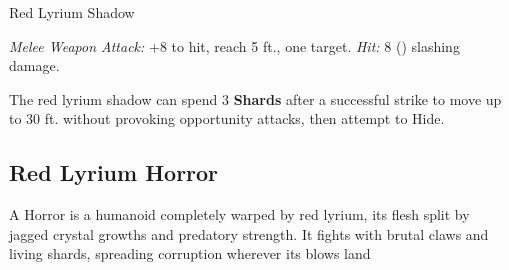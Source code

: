 \documentclass[letterpaper,twocolumn,openany,nodeprecatedcode,breakable,skins,xparse,most]{dndbook}
\begin{document}
\begin{monsterbox}{Red Lyrium Shadow}

\begin{rpg-monsteraction}
\textit{Melee Weapon Attack:} +8 to hit, reach 5 ft., one target. \textit{Hit:} 8 () slashing damage.
\end{rpg-monsteraction}


\begin{rpg-monsteraction}[Vanish]
The red lyrium shadow can spend 3 \textbf{Shards} after a successful strike to move up to 30 ft. without provoking opportunity attacks, then attempt to Hide.
\end{rpg-monsteraction}

\end{monsterbox}

\newpage

\subsection{Red Lyrium Horror}

A Horror is a humanoid completely warped by red lyrium, its flesh split by jagged crystal growths and predatory strength. It fights with brutal claws and living shards, spreading corruption wherever its blows land
\end{document}
